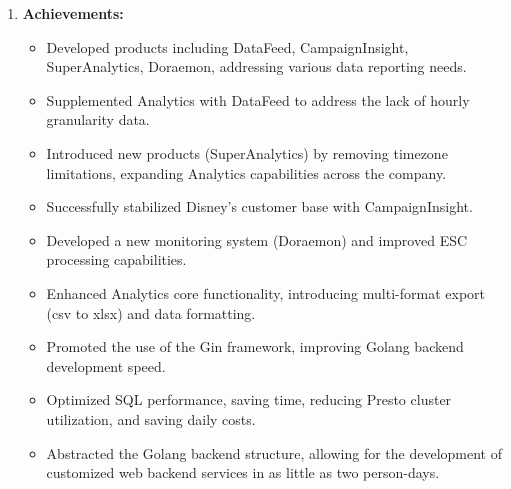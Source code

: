 \documentclass{resume}
\begin{document}
\begin{enumerate}
    \item \textbf{Achievements:}
    \begin{itemize}
        \item Developed products including DataFeed, CampaignInsight, SuperAnalytics, Doraemon, addressing various data reporting needs.
        \item Supplemented Analytics with DataFeed to address the lack of hourly granularity data.
        \item Introduced new products (SuperAnalytics) by removing timezone limitations, expanding Analytics capabilities across the company.
        \item Successfully stabilized Disney's customer base with CampaignInsight.
        \item Developed a new monitoring system (Doraemon) and improved ESC processing capabilities.
        \item Enhanced Analytics core functionality, introducing multi-format export (csv to xlsx) and data formatting.
        \item Promoted the use of the Gin framework, improving Golang backend development speed.
        \item Optimized SQL performance, saving time, reducing Presto cluster utilization, and saving daily costs.
        \item Abstracted the Golang backend structure, allowing for the development of customized web backend services in as little as two person-days.
    \end{itemize}
\end{enumerate}
\end{document}
